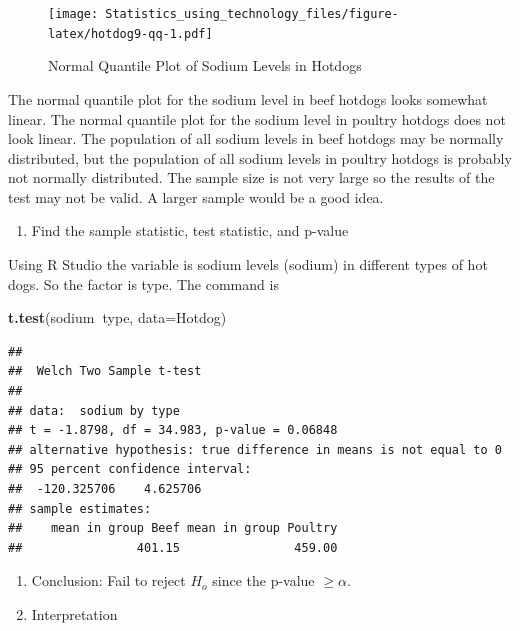 \documentclass[
]{book}
\newenvironment{Shaded}{\begin{snugshade}}{\end{snugshade}}
\newcommand{\DataTypeTok}[1]{\textcolor[rgb]{0.13,0.29,0.53}{#1}}
\newcommand{\KeywordTok}[1]{\textcolor[rgb]{0.13,0.29,0.53}{\textbf{#1}}}
\newcommand{\NormalTok}[1]{#1}
\newcommand{\OperatorTok}[1]{\textcolor[rgb]{0.81,0.36,0.00}{\textbf{#1}}}
\providecommand{\tightlist}{%
  \setlength{\itemsep}{0pt}\setlength{\parskip}{0pt}}
\begin{document}
\begin{figure}
\centering
\texttt{[image: Statistics\_using\_technology\_files/figure-latex/hotdog9-qq-1.pdf]}
\caption{\label{fig:hotdog9-qq}Normal Quantile Plot of Sodium Levels in Hotdogs}
\end{figure}

The normal quantile plot for the sodium level in beef hotdogs looks somewhat linear. The normal quantile plot for the sodium level in poultry hotdogs does not look linear. The population of all sodium levels in beef hotdogs may be normally distributed, but the population of all sodium levels in poultry hotdogs is probably not normally distributed. The sample size is not very large so the results of the test may not be valid. A larger sample would be a good idea.

\begin{enumerate}
\def\labelenumi{\arabic{enumi}.}
\setcounter{enumi}{3}
\tightlist
\item
  Find the sample statistic, test statistic, and p-value
\end{enumerate}

Using R Studio the variable is sodium levels (sodium) in different types of hot dogs. So the factor is type. The command is

\begin{Shaded}
\begin{Highlighting}[]
\KeywordTok{t.test}\NormalTok{(sodium}\OperatorTok{~}\NormalTok{type, }\DataTypeTok{data=}\NormalTok{Hotdog)}
\end{Highlighting}
\end{Shaded}

\begin{verbatim}
## 
##  Welch Two Sample t-test
## 
## data:  sodium by type
## t = -1.8798, df = 34.983, p-value = 0.06848
## alternative hypothesis: true difference in means is not equal to 0
## 95 percent confidence interval:
##  -120.325706    4.625706
## sample estimates:
##    mean in group Beef mean in group Poultry 
##                401.15                459.00
\end{verbatim}

\begin{enumerate}
\def\labelenumi{\arabic{enumi}.}
\setcounter{enumi}{4}
\item
  Conclusion: Fail to reject \(H_o\) since the p-value \(\ge \alpha\).
\item
  Interpretation
\end{enumerate}
\end{document}
